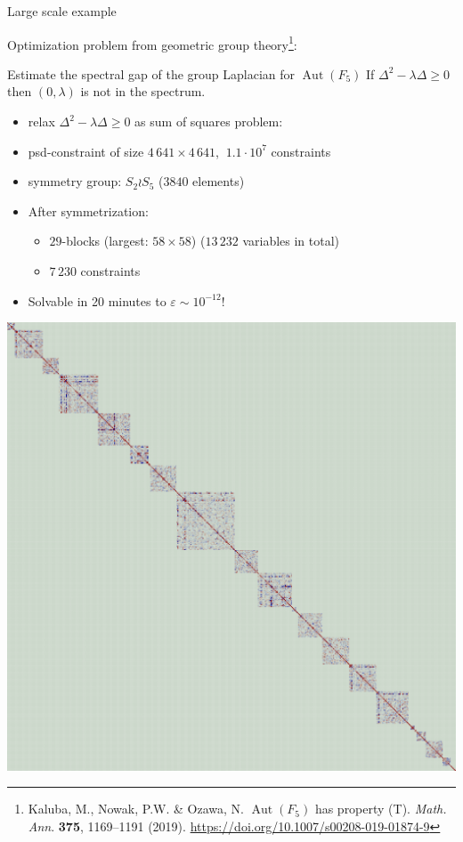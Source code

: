 \documentclass[9pt]{beamer}
\theoremstyle{definition}
\begin{document}
  \begin{frame}{Large scale example}

  Optimization problem from geometric group theory\footnote{Kaluba, M., Nowak, P.W. \& Ozawa, N. $\operatorname{Aut}(F_5)$ has property (T). \textit{Math. Ann}. \textbf{375}, 1169–1191 (2019). \url{https://doi.org/10.1007/s00208-019-01874-9}}:
  \begin{block}{Estimate the spectral gap of the group Laplacian for $\operatorname{Aut}(F_5)$}
     If $\Delta^2 - \lambda \Delta \geqslant 0$ then $(0, \lambda)$ is not in the spectrum.
  \end{block}
  \pause
    \begin{itemize}
      \item relax $\Delta^2 - \lambda \Delta \geqslant 0$ as sum of squares problem:
      \pause
      \item psd-constraint of size $4\,641\times 4\,641$, $~1.1\cdot 10^7$ constraints
      \item symmetry group: $S_2 \wr S_5$ ($3840$ elements)
      \item After symmetrization:
        \begin{itemize}
          \item $29$-blocks (largest: $58\times 58$) ($13\,232$ variables in total)
          \item $7\,230$ constraints
        \end{itemize}
      \item Solvable in 20 minutes to $\varepsilon \sim 10^{-12} $!
    \end{itemize}

  \end{frame}

  \begin{frame}
  \begin{center}
  \vfill
  \includegraphics[height=\textheight]{AutF5_blocks.png}
  \vfill
  \end{center}
  \end{frame}
\end{document}
